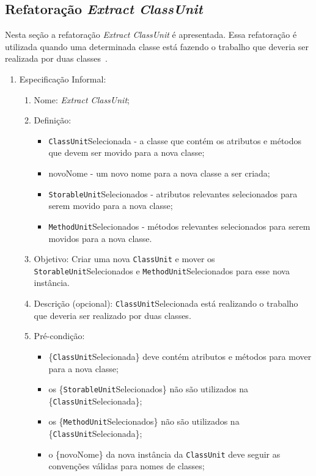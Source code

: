 	
	
\subsection{Refatoração \textit{Extract ClassUnit}}
Nesta seção a refatoração \textit{Extract ClassUnit} é apresentada. Essa refatoração é utilizada quando uma determinada classe está fazendo o trabalho que deveria ser realizada por duas classes~\cite{Fowler1999}. 

\begin{enumerate}
	\item Especificação Informal:
		\begin{enumerate}
			\item Nome: \textit{Extract ClassUnit};
			\item Definição:
			    \begin{itemize}
			        \item \texttt{ClassUnit}Selecionada - a classe que contém os atributos e métodos que devem ser movido para a nova classe;
			        \item novoNome - um novo nome para a nova classe a ser criada;
			        \item \texttt{StorableUnit}Selecionados - atributos relevantes selecionados para serem movido para a nova classe;
			        \item \texttt{MethodUnit}Selecionados - métodos relevantes selecionados para serem movidos para a nova classe.
			    \end{itemize}
			\item Objetivo: Criar uma nova \texttt{ClassUnit} e mover os \texttt{StorableUnit}Selecionados e \texttt{MethodUnit}Selecionados para esse nova instância.
			\item Descrição (opcional): \texttt{ClassUnit}Selecionada está realizando o trabalho que deveria ser realizado por duas classes.
			\item Pré-condição:
			    \begin{itemize}
			        \item \{\texttt{ClassUnit}Selecionada\} deve contém atributos e métodos para mover para a nova classe;
			        \item os \{\texttt{StorableUnit}Selecionados\} não são utilizados na \{\texttt{ClassUnit}Selecionada\};
			        \item os \{\texttt{MethodUnit}Selecionados\} não são utilizados na \{\texttt{ClassUnit}Selecionada\};
			        \item o \{novoNome\} da nova instância da \texttt{ClassUnit} deve seguir as convenções válidas para nomes de classes;

\end{itemize}
\end{enumerate}
\end{enumerate}
